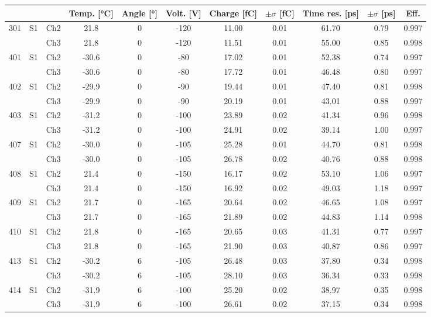 \begin{tabular}{ccccccccccc}
\toprule
 &  &  & Temp. [°C] & Angle [°] & Volt. [V] & Charge [fC] & \(\pm\sigma\) [fC] & Time res. [ps] & \(\pm\sigma\) [ps] & Eff. \\
\midrule
301 & S1 & Ch2 & 21.8 & 0 & -120 & 11.00 & 0.01 & 61.70 & 0.79 & 0.997 \\
 &  & Ch3 & 21.8 & 0 & -120 & 11.51 & 0.01 & 55.00 & 0.85 & 0.998 \\
401 & S1 & Ch2 & -30.6 & 0 & -80 & 17.02 & 0.01 & 52.38 & 0.74 & 0.997 \\
 &  & Ch3 & -30.6 & 0 & -80 & 17.72 & 0.01 & 46.48 & 0.80 & 0.997 \\
402 & S1 & Ch2 & -29.9 & 0 & -90 & 19.44 & 0.01 & 47.40 & 0.81 & 0.998 \\
 &  & Ch3 & -29.9 & 0 & -90 & 20.19 & 0.01 & 43.01 & 0.88 & 0.997 \\
403 & S1 & Ch2 & -31.2 & 0 & -100 & 23.89 & 0.02 & 41.34 & 0.96 & 0.998 \\
 &  & Ch3 & -31.2 & 0 & -100 & 24.91 & 0.02 & 39.14 & 1.00 & 0.997 \\
407 & S1 & Ch2 & -30.0 & 0 & -105 & 25.28 & 0.01 & 44.70 & 0.81 & 0.998 \\
 &  & Ch3 & -30.0 & 0 & -105 & 26.78 & 0.02 & 40.76 & 0.88 & 0.998 \\
408 & S1 & Ch2 & 21.4 & 0 & -150 & 16.17 & 0.02 & 53.10 & 1.06 & 0.997 \\
 &  & Ch3 & 21.4 & 0 & -150 & 16.92 & 0.02 & 49.03 & 1.18 & 0.997 \\
409 & S1 & Ch2 & 21.7 & 0 & -165 & 20.64 & 0.02 & 46.65 & 1.08 & 0.997 \\
 &  & Ch3 & 21.7 & 0 & -165 & 21.89 & 0.02 & 44.83 & 1.14 & 0.998 \\
410 & S1 & Ch2 & 21.8 & 0 & -165 & 20.65 & 0.03 & 41.31 & 0.77 & 0.997 \\
 &  & Ch3 & 21.8 & 0 & -165 & 21.90 & 0.03 & 40.87 & 0.86 & 0.997 \\
413 & S1 & Ch2 & -30.2 & 6 & -105 & 26.48 & 0.03 & 37.80 & 0.34 & 0.998 \\
 &  & Ch3 & -30.2 & 6 & -105 & 28.10 & 0.03 & 36.34 & 0.33 & 0.998 \\
414 & S1 & Ch2 & -31.9 & 6 & -100 & 25.20 & 0.02 & 38.97 & 0.35 & 0.998 \\
 &  & Ch3 & -31.9 & 6 & -100 & 26.61 & 0.02 & 37.15 & 0.34 & 0.998 \\
\bottomrule
\end{tabular}
